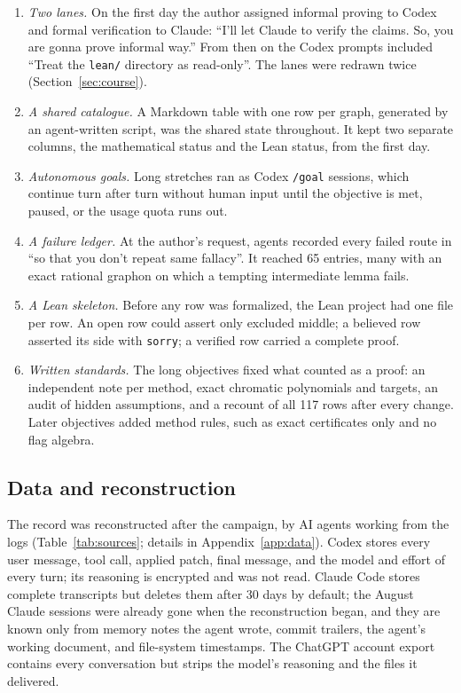 \documentclass[11pt,a4paper]{article}
\newcommand{\ttt}[1]{\texttt{#1}}
\begin{document}
\begin{enumerate}
\item \emph{Two lanes.} On the first day the author assigned informal proving to Codex and formal verification
  to Claude: ``I'll let Claude to verify the claims. So, you are gonna prove informal way.'' From then on the
  Codex prompts included ``Treat the \ttt{lean/} directory as read-only''. The lanes were redrawn twice
  (Section~\ref{sec:course}).
\item \emph{A shared catalogue.} A Markdown table with one row per graph, generated by an agent-written script,
  was the shared state throughout. It kept two separate columns, the mathematical status and the Lean status,
  from the first day.
\item \emph{Autonomous goals.} Long stretches ran as Codex \ttt{/goal} sessions, which continue turn after turn
  without human input until the objective is met, paused, or the usage quota runs out.
\item \emph{A failure ledger.} At the author's request, agents recorded every failed route in
   ``so that you don't repeat same fallacy''. It reached 65 entries, many with
  an exact rational graphon on which a tempting intermediate lemma fails.
\item \emph{A Lean skeleton.} Before any row was formalized, the Lean project had one file per row. An open row
  could assert only excluded middle; a believed row asserted its side with \ttt{sorry}; a verified row carried a
  complete proof.
\item \emph{Written standards.} The long objectives fixed what counted as a proof: an independent note per
  method, exact chromatic polynomials and targets, an audit of hidden assumptions, and a recount of all 117 rows
  after every change. Later objectives added method rules, such as exact certificates only and no flag algebra.
\end{enumerate}

\subsection{Data and reconstruction}\label{sec:data}

The record was reconstructed after the campaign, by AI agents working from the logs (Table~\ref{tab:sources};
details in Appendix~\ref{app:data}). Codex stores every user message, tool call, applied patch, final message,
and the model and effort of every turn; its reasoning is encrypted and was not read. Claude Code stores
complete transcripts but deletes them after 30 days by default; the August Claude sessions were already gone
when the reconstruction began, and they are known only from memory notes the agent wrote, commit trailers,
the agent's working document, and file-system timestamps. The ChatGPT account export contains every
conversation but strips the model's reasoning and the files it delivered.
\end{document}
